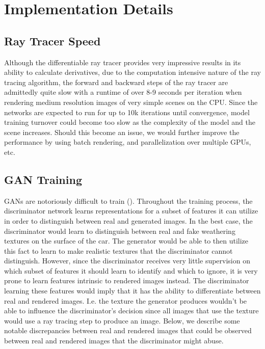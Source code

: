 \documentclass[letterpaper,doc,natbib]{apa6}
\begin{document}
\section{Implementation Details}

\subsection{Ray Tracer Speed}

Although the differentiable ray tracer provides very impressive results in its ability to calculate derivatives, due to the computation intensive nature of the ray tracing algorithm, the forward and backward steps of the ray tracer are admittedly quite slow with a runtime of over 8-9 seconds per iteration when rendering medium resolution images of very simple scenes on the CPU. Since the networks are expected to run for up to 10k iterations until convergence, model training turnover could become too slow as the complexity of the model and the scene increases. Should this become an issue, we would further improve the performance by using batch rendering, and parallelization over multiple GPUs, etc.

\subsection{GAN Training}

GANs are notoriously difficult to train (\cite{ganhard}). Throughout the training process, the discriminator network learns representations for a subset of features it can utilize in order to distinguish between real and generated images. In the best case, the discriminator would learn to distinguish between real and fake weathering textures on the surface of the car. The generator would be able to then utilize this fact to learn to make realistic textures that the discriminator cannot distinguish. However, since the discriminator receives very little supervision on which subset of features it should learn to identify and which to ignore, it is very prone to learn features intrinsic to rendered images instead. The discriminator learning these features would imply that it has the ability to differentiate between real and rendered images. I.e. the texture the generator produces wouldn't be able to influence the discriminator's decision since all images that use the texture would use a ray tracing step to produce an image. Below, we describe some notable discrepancies between real and rendered images that could be observed between real and rendered images that the discriminator might abuse.
\end{document}

